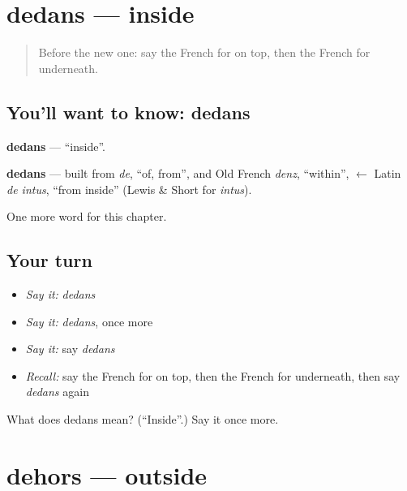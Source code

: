 \section[dedans]{dedans — inside}

\label{lesson:FR-C97-dedans}



\begin{quote}
Before the new one: say the French for on top, then the French for underneath.
\end{quote}

\subsection*{You'll want to know: dedans}
\textbf{dedans} — \textquotedblleft{}inside\textquotedblright{}.

\begin{cousinweb}
\textbf{dedans} — built from \emph{de}, \textquotedblleft{}of, from\textquotedblright{}, and Old French \emph{denz}, \textquotedblleft{}within\textquotedblright{}, $\leftarrow$ Latin \emph{de intus}, \textquotedblleft{}from inside\textquotedblright{} (Lewis \& Short for \emph{intus}).
\end{cousinweb}

\begin{grammarlens}[title={What you've built}]
One more word for this chapter.
\end{grammarlens}

\subsection*{Your turn}
\begin{itemize}
\raggedright
  \item \emph{Say it:} \emph{dedans}
  \item \emph{Say it:} \emph{dedans}, once more
  \item \emph{Say it:} say \emph{dedans}
  \item \emph{Recall:} say the French for on top, then the French for underneath, then say \emph{dedans} again
\end{itemize}

\begin{tcolorbox}[breakable,colback=teal!4,colframe=teal!35!black,title={Before you move on}]
What does dedans mean? (\textquotedblleft{}Inside\textquotedblright{}.) Say it once more.
\end{tcolorbox}
\section[dehors]{dehors — outside}

